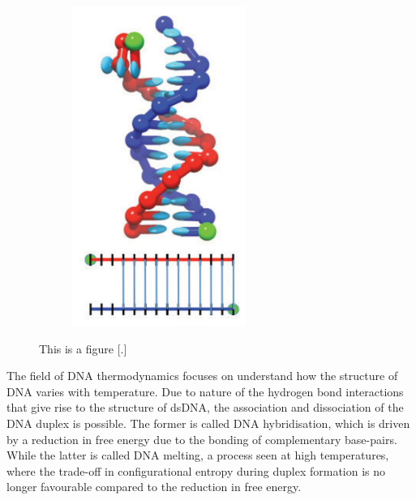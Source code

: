 \begin{figure}[ht]
\begin{centering}
\begin{subfigure}[t]{\dimexpr.2\linewidth-1.3em\relax}
  \includegraphics[width=.8\linewidth,valign=t]{Figures/hybridDiag5.png}
  \end{subfigure}
  \caption{This is a figure [.]}
  \label{fig:test}
  \end{centering}

\end{figure}


\newpage



 The field of DNA thermodynamics focuses on understand how the structure of DNA varies
 with temperature. Due to nature of the hydrogen bond interactions that give rise to the
structure of dsDNA, the association and dissociation of the DNA duplex is possible. The
former is called DNA hybridisation, which is driven by a reduction in free energy due to
the bonding of complementary base-pairs. While the latter is called DNA melting, a
process seen at high temperatures, where the trade-off in configurational entropy during
duplex formation is no longer favourable compared to the reduction in free energy.

